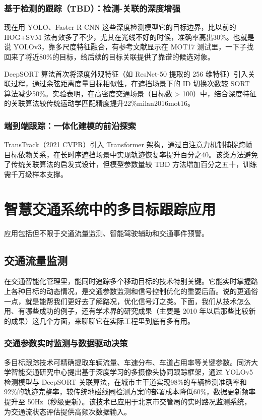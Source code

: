 \subsubsection{基于检测的跟踪（TBD）：检测-关联的深度增强}
现在用 YOLO、Faster R-CNN 这些深度检测模型它的目标边界，比以前的 HOG+SVM 法有效多了不少，尤其在光线不好的时候，准确率高出30\%。也就是说 YOLOv3，靠多尺度特征融合，有参考文献\cite{ren2015faster}显示在 MOT17 测试里，一下子找回来了将近80\%的目标，给后续的目标关联提供了靠谱的候选对象。

DeepSORT 算法\cite{wojke2017simple}首次将深度外观特征（如 ResNet-50 提取的 256 维特征）引入关联过程，通过余弦距离度量目标相似性，在遮挡场景下的 ID 切换次数较 SORT 算法减少50\%。实验表明，在高密度交通场景（目标数 > 100）中，结合深度特征的关联算法较传统运动学匹配精度提升22\%{milan2016mot16}。

\subsubsection{端到端跟踪：一体化建模的前沿探索}


TransTrack\cite{zhang2021transtrack}（2021 CVPR）引入 Transformer 架构，通过自注意力机制捕捉跨帧目标依赖关系，在长时序遮挡场景中实现轨迹恢复率提升百分之40。该类方法避免了传统关联算法的启发式设计，但模型参数量较 TBD 方法增加百分之五十，训练需千万级样本支撑。



\section{智慧交通系统中的多目标跟踪应用}

应用包括但不限于交通流量监测、智能驾驶辅助和交通事件预警。

\subsection{交通流量监测}

在交通智能化管理里，能同时追踪多个移动目标的技术特别关键。它能实时掌握路上各种目标的动态情况，是交通参数监测和信号控制优化的重要后盾。说的更通俗一点，就是能帮我们更好去了解路况，优化信号灯之类。下面，我们从技术怎么用、有哪些成功的例子，还有学术界的研究成果（主要是 2010 年以后那些比较新的成果）这几个方面，来聊聊它在实际工程里到底有多有用。

\subsubsection{交通参数实时监测与数据驱动决策}
多目标跟踪技术可精确提取车辆流量、车速分布、车道占用率等关键参数。同济大学智能交通研究中心\cite{tongji2022visual}提出基于深度学习的多摄像头协同跟踪框架，通过 YOLOv5 检测模型与 DeepSORT 关联算法，在城市主干道实现98\%的车辆检测准确率和92\%的轨迹完整率，较传统地磁线圈检测方案的部署成本降低60\%，数据更新频率提升至 50Hz（秒级更新）。该技术已应用于北京市交管局的实时路况监测系统，为交通流状态评估提供高频次数据输入。
